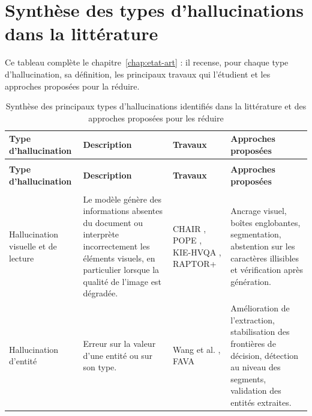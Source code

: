 
\chapter{Synthèse des types d'hallucinations dans la littérature}\label{annexe:hallucinations}

Ce tableau complète le chapitre~\ref{chap:etat-art} : il recense, pour chaque type d'hallucination, sa définition, les principaux travaux qui l'étudient et les approches proposées pour la réduire.

{\footnotesize
\renewcommand{\arraystretch}{1.35}
\begin{longtable}{|>{\raggedright\arraybackslash}p{2.6cm}|>{\raggedright\arraybackslash}p{4.2cm}|>{\raggedright\arraybackslash}p{3.4cm}|>{\raggedright\arraybackslash}p{4.0cm}|}
\caption{Synthèse des principaux types d'hallucinations identifiés dans la littérature et des approches proposées pour les réduire}
\label{tab:hallucinations}\\
\hline
\textbf{Type d'hallucination} & \textbf{Description} & \textbf{Travaux} & \textbf{Approches proposées} \\
\hline
\endfirsthead
\multicolumn{4}{l}{\textit{Tableau~\ref{tab:hallucinations} (suite)}}\\
\hline
\textbf{Type d'hallucination} & \textbf{Description} & \textbf{Travaux} & \textbf{Approches proposées} \\
\hline
\endhead
\hline
\multicolumn{4}{r}{\textit{Suite à la page suivante}}\\
\endfoot
\hline
\endlastfoot
Hallucination visuelle et de lecture &
Le modèle génère des informations absentes du document ou interprète incorrectement les éléments visuels, en particulier lorsque la qualité de l'image est dégradée. &
CHAIR \cite{rohrbach2018chair}, POPE \cite{li2023pope}, KIE-HVQA \cite{he2025seeing}, RAPTOR+ \cite{raptorplus2026} &
Ancrage visuel, boîtes englobantes, segmentation, abstention sur les caractères illisibles et vérification après génération.\\
\hline
Hallucination d'entité &
Erreur sur la valeur d'une entité ou sur son type. &
Wang et al. \cite{wang2024feature}, FAVA \cite{mishra2024fava} &
Amélioration de l'extraction, stabilisation des frontières de décision, détection au niveau des segments, validation des entités extraites.\\

\end{longtable}}
